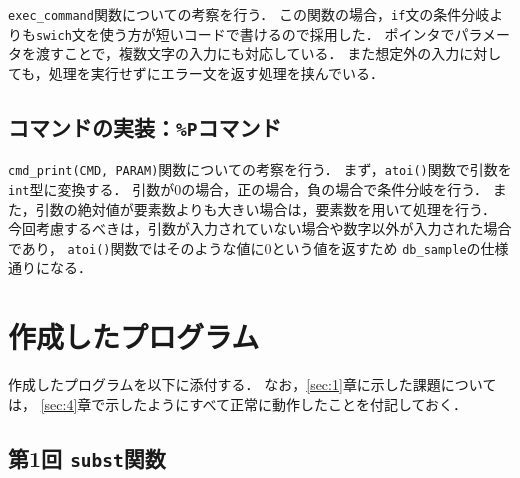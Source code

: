 \documentclass[autodetect-engine,dvi=dvipdfmx,ja=standard,
               a4j,11pt]{bxjsarticle}
\begin{document}
\verb|exec_command|関数についての考察を行う．
この関数の場合，\verb|if|文の条件分岐よりも\verb|swich|文を使う方が短いコードで書けるので採用した．
ポインタでパラメータを渡すことで，複数文字の入力にも対応している．
また想定外の入力に対しても，処理を実行せずにエラー文を返す処理を挟んでいる．

\subsection{コマンドの実装：\texttt{\%P}コマンド}

\verb|cmd_print(CMD, PARAM)|関数についての考察を行う．
まず，\verb|atoi()|関数で引数を\verb|int|型に変換する．
引数が0の場合，正の場合，負の場合で条件分岐を行う．
また，引数の絶対値が要素数よりも大きい場合は，要素数を用いて処理を行う．
今回考慮するべきは，引数が入力されていない場合や数字以外が入力された場合であり，
\verb|atoi()|関数ではそのような値に$0$という値を返すため
\verb|db_sample|の仕様通りになる．




\section{作成したプログラム} \label{sec:7}

作成したプログラムを以下に添付する．
なお，\ref{sec:1}章に示した課題については，
\ref{sec:4}章で示したようにすべて正常に動作したことを付記しておく．

\subsection{第1回 \texttt{subst}関数} \label{code:1}
\end{document}
